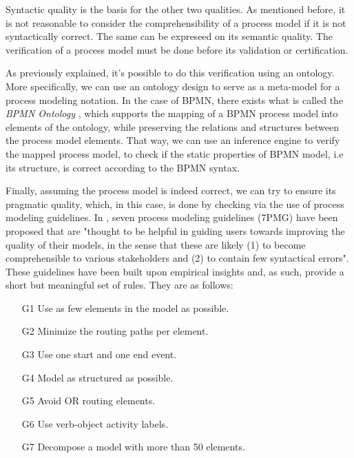 \documentclass[a4paper,twoside]{article}
\begin{document}
Syntactic quality is the basis for the other two qualities. As mentioned before, it is not reasonable to consider the comprehensibility of a process model if it is not syntactically correct. The same can be expreseed on its semantic quality. The verification of a process model must be done before its validation or certification.

As previously explained, it's possible to do this verification using an ontology. More specifically, we can use an ontology design to serve as a meta-model for a process modeling notation. In the case of BPMN, there exists what is called the \textit{BPMN Ontology} \cite{Rospocher2014foisbpmn}, which supports the mapping of a BPMN process model into elements of the ontology, while preserving the relations and structures between the process model elements. That way, we can use an inference engine to verify the mapped process model, to check if the static properties of BPMN model, i.e its structure, is correct according to the BPMN syntax.



Finally, assuming the process model is indeed correct, we can try to ensure its pragmatic quality, which, in this case, is done by checking via the use of process modeling guidelines.  In \cite{Mendling2010}, seven process modeling guidelines (7PMG) have been proposed that are "thought to be helpful in guiding users towards improving the quality of their models, in the sense that these are likely (1) to become comprehensible to various stakeholders and (2) to contain few syntactical errors". These guidelines have been built upon empirical insights and, as such, provide a short but meaningful set of rules. They are as follows:
\begin{enumerate}
	\item[G1] Use as few elements in the model as possible.
	\item[G2] Minimize the routing paths per element.
	\item[G3] Use one start and one end event.
	\item[G4] Model as structured as possible. 
	\item[G5] Avoid OR routing elements.
	\item[G6] Use verb-object activity labels.
	\item[G7] Decompose a model with more than 50 elements.
\end{enumerate}
\end{document}
